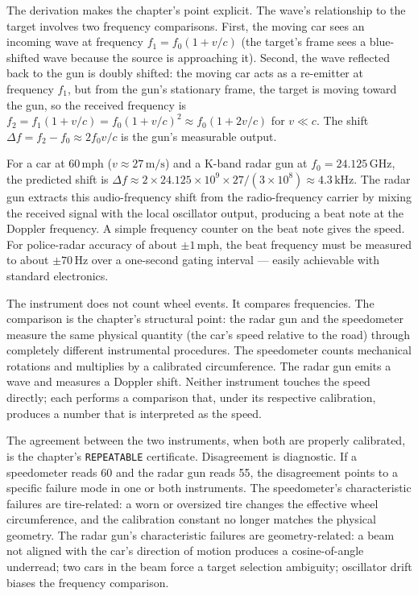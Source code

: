 The derivation makes the chapter's point explicit. The wave's relationship to
the target involves two frequency comparisons. First, the moving car sees an
incoming wave at frequency $f_1 = f_0 (1 + v/c)$ (the target's frame sees a
blue-shifted wave because the source is approaching it). Second, the wave
reflected back to the gun is doubly shifted: the moving car acts as a
re-emitter at frequency $f_1$, but from the gun's stationary frame, the
target is moving toward the gun, so the received frequency is
$f_2 = f_1 (1 + v/c) = f_0 (1 + v/c)^2 \approx f_0 (1 + 2v/c)$ for $v \ll c$.
The shift $\Delta f = f_2 - f_0 \approx 2 f_0 v / c$ is the gun's measurable
output.

For a car at $60\,\mathrm{mph}$ ($v \approx 27\,\mathrm{m/s}$) and a K-band
radar gun at $f_0 = 24{.}125\,\mathrm{GHz}$, the predicted shift is
$\Delta f \approx 2 \times 24{.}125 \times 10^9 \times 27 / (3 \times 10^8)
\approx 4{.}3\,\mathrm{kHz}$. The radar gun extracts this audio-frequency
shift from the radio-frequency carrier by mixing the received signal with
the local oscillator output, producing a beat note at the Doppler frequency.
A simple frequency counter on the beat note gives the speed. For
police-radar accuracy of about $\pm 1\,\mathrm{mph}$, the beat frequency must
be measured to about $\pm 70\,\mathrm{Hz}$ over a one-second gating interval
--- easily achievable with standard electronics.

The instrument does not count wheel events. It compares frequencies. The
comparison is the chapter's structural point: the radar gun and the
speedometer measure the same physical quantity (the car's speed relative to
the road) through completely different instrumental procedures. The
speedometer counts mechanical rotations and multiplies by a calibrated
circumference. The radar gun emits a wave and measures a Doppler shift.
Neither instrument touches the speed directly; each performs a comparison
that, under its respective calibration, produces a number that is interpreted
as the speed.

The agreement between the two instruments, when both are properly calibrated,
is the chapter's \texttt{REPEATABLE} certificate. Disagreement is diagnostic.
If a speedometer reads 60 and the radar gun reads 55, the disagreement points
to a specific failure mode in one or both instruments. The speedometer's
characteristic failures are tire-related: a worn or oversized tire changes
the effective wheel circumference, and the calibration constant no longer
matches the physical geometry. The radar gun's characteristic failures are
geometry-related: a beam not aligned with the car's direction of motion
produces a cosine-of-angle underread; two cars in the beam force a target
selection ambiguity; oscillator drift biases the frequency comparison.

